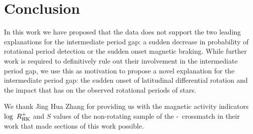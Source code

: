\section{Conclusion}
\label{sec:conclusion}

In this work we have proposed that the data does not support the two leading explanations for the intermediate period gap: a sudden decrease in probability of rotational period detection or the sudden onset magnetic braking.
While further work is required to definitively rule out their involvement in the intermediate period gap, we use this as motivation to propose a novel explanation for the intermediate period gap: the sudden onset of latitudinal differential rotation and the impact that has on the observed rotational periods of stars.

We thank Jing Hua Zhang for providing us with the magnetic activity indicators $\log \ R^{+}_{\rm{HK}}$ and $S$ values of the non-rotating sample of the \kepler-\lamost\ crossmatch in their work \citet{zhang_magnetic_2020} that made sections of this work possible.


